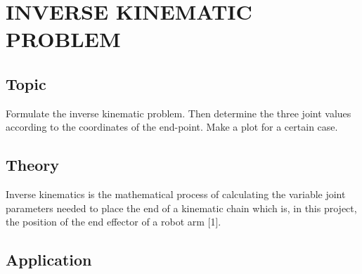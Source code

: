 \chapter{INVERSE KINEMATIC PROBLEM}
    \section{Topic}
        Formulate the inverse kinematic problem. Then determine the three joint values according 
        to the coordinates of the end-point. Make a plot for a certain case.
    \section{Theory}
        Inverse kinematics is the mathematical process of calculating the variable joint parameters 
        needed to place the end of a kinematic chain which is, in this project, the position of the end 
        effector of a robot arm [1].

    \section{Application}

